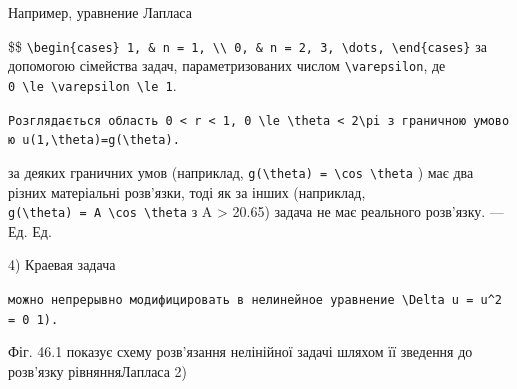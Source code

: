 \documentclass[
  ukrainian,
]{article}
\begin{document}
Например, уравнение Лапласа

\$\$
\texttt{\textbackslash{}begin\{cases\}\ 1,\ \&\ n\ =\ 1,\ \textbackslash{}\textbackslash{}\ 0,\ \&\ n\ =\ 2,\ 3,\ \textbackslash{}dots,\ \textbackslash{}end\{cases\}}
за допомогою сімейства задач, параметризованих числом
\texttt{\textbackslash{}varepsilon}, де
\texttt{0\ \textbackslash{}le\ \textbackslash{}varepsilon\ \textbackslash{}le\ 1}.

\texttt{Розглядається\ область\ \textquotesingle{}0\ \textless{}\ r\ \textless{}\ 1\textquotesingle{},\ \textquotesingle{}0\ \textbackslash{}le\ \textbackslash{}theta\ \textless{}\ 2\textbackslash{}pi\textquotesingle{}\ з\ граничною\ умовою\ \textquotesingle{}u(1,\textbackslash{}theta)=g(\textbackslash{}theta)\textquotesingle{}.}

за деяких граничних умов (наприклад,
\texttt{g(\textbackslash{}theta)\ =\ \textbackslash{}cos\ \textbackslash{}theta}
) має два різних матеріальні розв'язки, тоді як за інших (наприклад,
\texttt{g(\textbackslash{}theta)\ =\ A\ \textbackslash{}cos\ \textbackslash{}theta}
з A \textgreater{} 20.65) задача не має реального розв'язку. --- Ед. Ед.

4) Краевая задача

\texttt{можно\ непрерывно\ модифицировать\ в\ нелинейное\ уравнение\ \textquotesingle{}\textbackslash{}Delta\ u\ =\ u\^{}2\ =\ 0\textquotesingle{}\ 1).}

Фіг. 46.1 показує схему розв'язання нелінійної задачі шляхом її зведення
до розв'язку рівнянняЛапласа 2)
\end{document}
